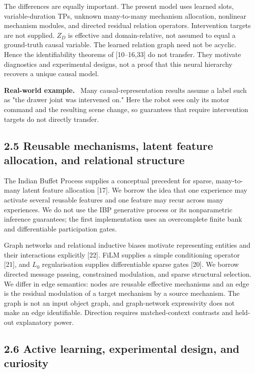 \documentclass[11pt]{article}
\newenvironment{example}{%
  \par\smallskip\noindent\begin{minipage}{\textwidth}%
  \color{teal!60!black}\small
  \textbf{\color{teal!70!black}Real-world example.}\
}{%
  \end{minipage}\par\smallskip}
\begin{document}
The differences are equally important. The present model uses learned slots, variable-duration TPs, unknown many-to-many mechanism
allocation, nonlinear mechanism modules, and directed residual relation operators. Intervention targets are not supplied. $Z_D$ is
effective and domain-relative, not assumed to equal a ground-truth causal variable. The learned relation graph need not be acyclic.
Hence the identifiability theorems of [10--16,33] do not transfer. They motivate diagnostics and experimental designs, not a proof
that this neural hierarchy recovers a unique causal model.

\begin{example}
Many causal-representation results assume a label such as "the drawer joint was intervened on." Here the robot sees only its motor
command and the resulting scene change, so guarantees that require intervention targets do not directly transfer.
\end{example}

\subsection*{2.5 Reusable mechanisms, latent feature allocation, and relational structure}

The Indian Buffet Process supplies a conceptual precedent for sparse, many-to-many latent feature allocation [17]. We borrow the
idea that one experience may activate several reusable features and one feature may recur across many experiences. We do not use the
IBP generative process or its nonparametric inference guarantees; the first implementation uses an overcomplete finite bank and
differentiable participation gates.

Graph networks and relational inductive biases motivate representing entities and their interactions explicitly [22]. FiLM supplies
a simple conditioning operator [21], and $L_0$ regularisation supplies differentiable sparse gates [20]. We borrow directed message
passing, constrained modulation, and sparse structural selection. We differ in edge semantics: nodes are reusable effective
mechanisms and an edge is the residual modulation of a target mechanism by a source mechanism. The graph is not an input object
graph, and graph-network expressivity does not make an edge identifiable. Direction requires matched-context contrasts and held-out
explanatory power.

\subsection*{2.6 Active learning, experimental design, and curiosity}
\end{document}
